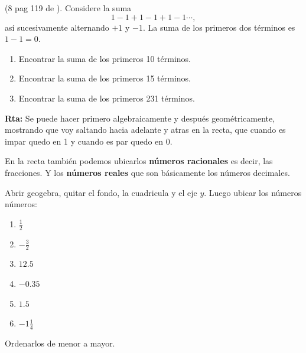 \begin{ejemplo}
(8 pag 119 de \cite{Dimensions_Math_6A}). Considere la suma
\[
			1-1+1-1+1-1\cdots,
\]
así sucesivamente alternando $+1$ y $-1$. La suma de los primeros dos términos es $1-1=0$.
		\begin{enumerate}[label=\Alph*)]
					\item Encontrar la suma de los primeros 10 términos.
					\item Encontrar la suma de los primeros 15 términos.
					\item Encontrar la suma de los primeros 231 términos.						
		\end{enumerate}
\textbf{Rta: }	Se puede hacer primero algebraicamente y después geométricamente, mostrando que voy saltando hacia adelante y atras en la recta, que cuando es impar quedo en 1 y cuando es par quedo en 0.
\end{ejemplo}

En la recta también podemos ubicarlos \textbf{números racionales} es decir, las fracciones. Y los \textbf{números reales } que son básicamente los números decimales.
\begin{ejemplo}
Abrir geogebra, quitar el fondo, la cuadricula y el eje $y$. Luego ubicar los números números:
\begin{multicols}{2}
		\begin{enumerate}[label=\Alph*)]
				\item $\frac{1}{2}$
				\item $-\frac{3}{2}$
				\item $12.5$
				\item $-0.35$
				\item $1.5$
				\item $-1\frac{1}{4}$
		\end{enumerate}
\end{multicols}
Ordenarlos de menor a mayor.
\end{ejemplo}

